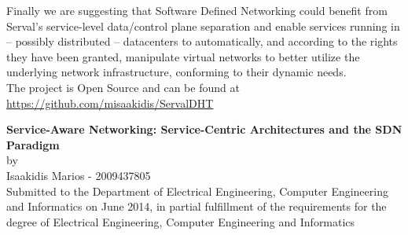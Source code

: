 \documentclass[12pt,a4paper,oneside]{article}
\begin{document}
Finally we are suggesting that Software Defined Networking could benefit from Serval's service-level data/control plane separation and enable services running in – possibly distributed – datacenters to automatically, and according to the rights they have been granted, manipulate virtual networks to better utilize the underlying network infrastructure, conforming to their dynamic needs.\\[0.1cm]

\noindent The project is Open Source and can be found at\\ 
\noindent \href{https://github.com/misaakidis/ServalDHT}{https://github.com/misaakidis/ServalDHT}


\newpage
{}
\tableofcontents

\newpage
{}
{}
\listoffigures

\newpage
{}
{}
\listoftables

\newpage
\renewcommand{\nomname}{Abbreviations}
{}
\printnomenclature


\newpage
{}
\setcounter{page}{1}
\begin{center}
{}
{\large {\bf  Service-Aware Networking: Service-Centric Architectures and the SDN Paradigm}\\[0.5cm] by \\[0.5cm] Isaakidis Marios - 2009437805}
 ~\\[0.5cm]
Submitted to the Department of Electrical Engineering, Computer Engineering and Informatics on June 2014, in partial fulfillment of the requirements for the degree of Electrical Engineering, Computer Engineering and Informatics
\end{center}

\vfill
\end{document}
